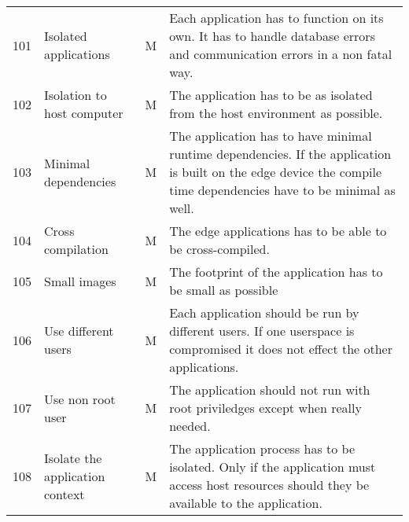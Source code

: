 \begin{longtable}{l p{3cm} p{0.8cm} p{8.5cm} }
101                     & Isolated applications                   & M      & Each application has to function on its own. It has to handle database errors and communication errors in a non fatal way.                                                                                                          \\
102                     & Isolation to host computer              & M      & The application has to be as isolated from the host environment as possible.                                                                                                                                                        \\
103                     & Minimal dependencies                    & M      & The application has to have minimal runtime dependencies. If the application is built on the edge device the compile time dependencies have to be minimal as well.                                                                  \\
104                     & Cross compilation                       & M      & The edge applications has to be able to be cross-compiled.                                                                                                                                                                          \\
105                     & Small images                            & M      & The footprint of the application has to be small as possible                                                                                                                                                                        \\
106                     & Use different users                     & M      & Each application should be run by different users. If one userspace is compromised it does not effect the other applications.                                                                                                       \\
107                     & Use non root user                       & M      & The application should not run with root priviledges except when really needed.                                                                                                                                                     \\
108                     & Isolate the application context         & M      & The application process has to be isolated. Only if the application must access host resources should they be available to the application.                                                                                         \\

\end{longtable}
